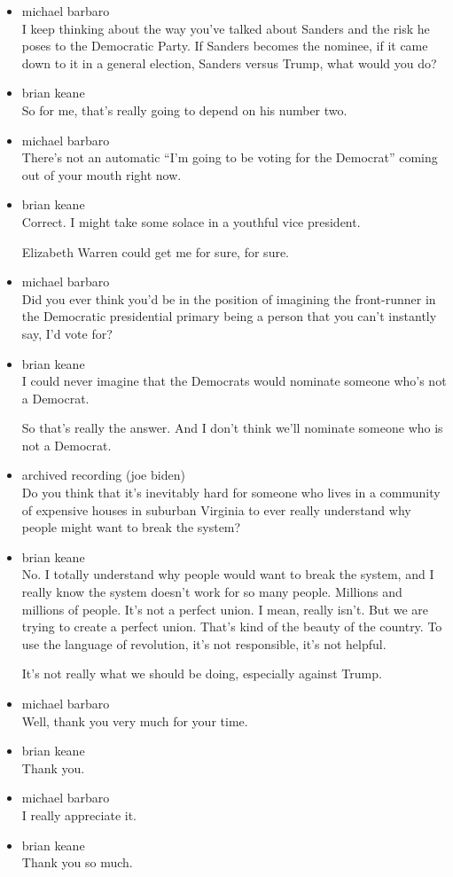 \begin{itemize}
\item
  michael barbaro\\
  I keep thinking about the way you've talked about Sanders and the risk
  he poses to the Democratic Party. If Sanders becomes the nominee, if
  it came down to it in a general election, Sanders versus Trump, what
  would you do?
\item
  brian keane\\
  So for me, that's really going to depend on his number two.
\item
  michael barbaro\\
  There's not an automatic ``I'm going to be voting for the Democrat''
  coming out of your mouth right now.
\item
  brian keane\\
  Correct. I might take some solace in a youthful vice president.

  Elizabeth Warren could get me for sure, for sure.
\item
  michael barbaro\\
  Did you ever think you'd be in the position of imagining the
  front-runner in the Democratic presidential primary being a person
  that you can't instantly say, I'd vote for?
\item
  brian keane\\
  I could never imagine that the Democrats would nominate someone who's
  not a Democrat.

  So that's really the answer. And I don't think we'll nominate someone
  who is not a Democrat.
\item
  archived recording (joe biden)\\
  Do you think that it's inevitably hard for someone who lives in a
  community of expensive houses in suburban Virginia to ever really
  understand why people might want to break the system?
\item
  brian keane\\
  No. I totally understand why people would want to break the system,
  and I really know the system doesn't work for so many people. Millions
  and millions of people. It's not a perfect union. I mean, really
  isn't. But we are trying to create a perfect union. That's kind of the
  beauty of the country. To use the language of revolution, it's not
  responsible, it's not helpful.

  It's not really what we should be doing, especially against Trump.
\item
  michael barbaro\\
  Well, thank you very much for your time.
\item
  brian keane\\
  Thank you.
\item
  michael barbaro\\
  I really appreciate it.
\item
  brian keane\\
  Thank you so much.
\end{itemize}

